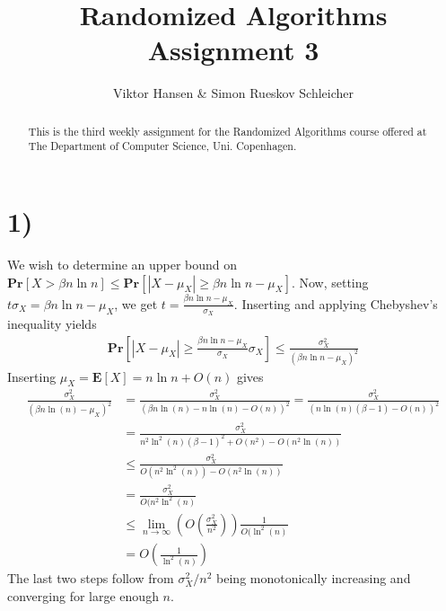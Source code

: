 \documentclass[12pt]{article}
\begin{document}
\nocite{*}


\title{Randomized Algorithms \\
       Assignment 3}

\author{Viktor Hansen \& Simon Rueskov Schleicher}

\maketitle

\begin{abstract}
  This is the third weekly assignment for the Randomized Algorithms course offered at The Department of Computer Science, Uni. Copenhagen.
\end{abstract}

\pagebreak

\section*{1)}
We wish to determine an upper bound on $\mathbf{Pr} \left[ X > \beta n \ln n \right] \leq \mathbf{Pr} \left[ \left| X - \mu_X \right| \geq \beta n \ln n - \mu_X \right]$. Now, setting $t\sigma_X = \beta n \ln n - \mu_X$, we get $t = \frac{\beta n \ln n - \mu_X}{\sigma_X}$. Inserting and applying Chebyshev's inequality yields
\begin{align*}
\mathbf{Pr} \left[ \left| X - \mu_X \right| \geq \frac{\beta n \ln n - \mu_X}{\sigma_X} \sigma_X \right] \leq \frac{\sigma_X^2}{(\beta n \ln n - \mu_X)^2}
\end{align*}
Inserting $\mu_X = \mathbf{E} \left[ X \right] = n \ln n + O(n)$ gives
\begin{align*}
\frac{\sigma_X^2}{(\beta n \ln (n) - \mu_X)^2} &= \frac{\sigma_X^2}{(\beta n \ln (n) - n \ln(n) - O(n))^2} = \frac{\sigma_X^2}{(n \ln(n)(\beta - 1) - O(n))^2} \\
&= \frac{\sigma_X^2}{n^2 \ln^2(n) (\beta - 1)^2 + O(n^2) - O(n^2 \ln(n))} \\
&\leq \frac{\sigma_X^2}{O(n^2 \ln^2(n)) - O(n^2 \ln(n))} \\
&= \frac{\sigma_X^2}{O(n^2 \ln^2(n)} \\
&\leq \lim_{n \rightarrow \infty} \left( O \left( \frac{\sigma_X^2}{n^2} \right) \right) \frac{1}{O(\ln^2(n)} \\
& = O \left( \frac{1}{\ln^2(n)} \right)
\end{align*}
The last two steps follow from $\sigma_X^2/n^2$ being monotonically increasing and converging for large enough $n$.
\end{document}
